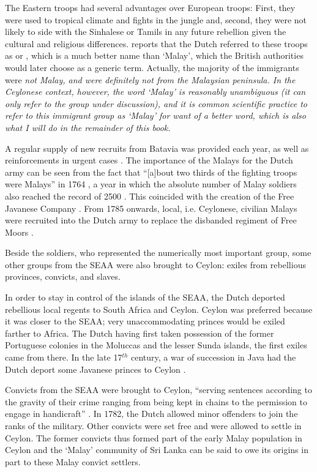 The Eastern troops had several advantages over European troops: First, they were used to tropical climate and fights in the jungle \citep[46]{Hussainmiya1990} and,  second, they were not likely to side with the Sinhalese or Tamils in any future rebellion  given the cultural and religious differences. \citet[55]{Hussainmiya1987} reports that the Dutch referred to these troops as  or ,  which is a much better name than `Malay', which the British authorities would  later choose as a generic term. Actually, the majority of the immigrants were \em not \em Malay, and were definitely not from the Malaysian peninsula. In the Ceylonese context, however, the word `Malay' is reasonably unambiguous (it can only refer to the group under discussion), and it is common scientific practice to refer to this immigrant group as `Malay' for want of a better word, which is also what I will do in the remainder of this book.

A regular supply of new recruits from Batavia was provided each year, as well as reinforcements in urgent cases \citep[48]{Hussainmiya1987}. The importance of the Malays for the Dutch army can be seen from the fact that ``[a]bout two thirds of the fighting troops were Malays'' in 1764 \citep[37]{Powell1973}, a year in which  the absolute number of Malay soldiers  also reached the record of 2500 \citep[49]{Hussainmiya1990}. This coincided with the creation of the Free Javanese Company \citep[52]{Hussainmiya1990}. From 1785 onwards, local, i.e. Ceylonese, civilian Malays were recruited into the Dutch army to replace the disbanded regiment of Free Moors  \citep[54]{Hussainmiya1987}.

Beside the soldiers, who represented the numerically  most important group, some other groups   from the SEAA were also brought to Ceylon: exiles from rebellious provinces, convicts, and slaves.

In order to stay in control of the islands of the SEAA, the Dutch
deported rebellious local regents to South Africa and Ceylon.   Ceylon
was preferred because it was closer to the SEAA; very
unaccommodating princes would be exiled farther to Africa. The
Dutch having first taken possession of the former Portuguese
colonies in the Moluccas and the lesser Sunda islands, the first
exiles came from there. In the late 17$^{th}$ century, a war of
succession in Java had the Dutch deport some Javanese princes to
Ceylon \citep[38]{Hussainmiya1990}.

Convicts from the SEAA were brought to Ceylon, ``serving sentences according to the gravity of their crime ranging from being kept in chains to the permission to engage in handicraft''  \citep[44]{Hussainmiya1990}.
In 1782, the Dutch allowed minor offenders to join the ranks of the military. Other convicts were set free and were allowed to settle in Ceylon.   The  former convicts  thus formed part of the early Malay population in Ceylon and the `Malay' community of Sri Lanka can be said to owe its origins in part to these Malay convict settlers.

